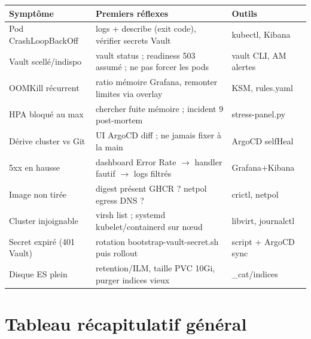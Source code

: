 \documentclass[12pt,a4paper,oneside]{report}
\begin{document}
\begin{center}\label{tab:ch-index-des-runbooks}\end{center}
\begin{longtable}{@{}p{4.2cm}p{6.6cm}p{3.4cm}@{}}
\toprule
\textbf{Symptôme} & \textbf{Premiers réflexes} & \textbf{Outils} \\
\midrule
\endhead
Pod CrashLoopBackOff & logs + describe (exit code), vérifier secrets Vault & kubectl, Kibana \\
Vault scellé/indispo & vault status ; readiness 503 assumé ; ne pas forcer les pods & vault CLI, AM alertes \\
OOMKill récurrent & ratio mémoire Grafana, remonter limites via overlay & KSM, rules.yaml \\
HPA bloqué au max & chercher fuite mémoire ; incident 9 post-mortem & stress-panel.py \\
Dérive cluster vs Git & UI ArgoCD diff ; ne jamais fixer à la main & ArgoCD selfHeal \\
5xx en hausse & dashboard Error Rate $\rightarrow$ handler fautif $\rightarrow$ logs filtrés & Grafana+Kibana \\
Image non tirée & digest présent GHCR ? netpol egress DNS ? & crictl, netpol \\
Cluster injoignable & virsh list ; systemd kubelet/containerd sur nœud & libvirt, journalctl \\
Secret expiré (401 Vault) & rotation bootstrap-vault-secret.sh puis rollout & script + ArgoCD sync \\
Disque ES plein & retention/ILM, taille PVC 10Gi, purger indices vieux & \_cat/indices \\
\bottomrule
\end{longtable}

\section{Tableau récapitulatif général}\label{sec:recap}
\end{document}
